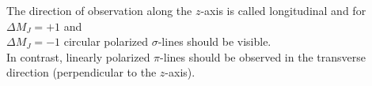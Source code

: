 The direction of observation along the $z$-axis is called longitudinal and for $\Delta M_J = + 1$ and\\$\Delta M_J = - 1$ circular polarized $\sigma$-lines should be visible.\\
In contrast, linearly polarized $\pi$-lines should be observed in the transverse direction (perpendicular to the $z$-axis).